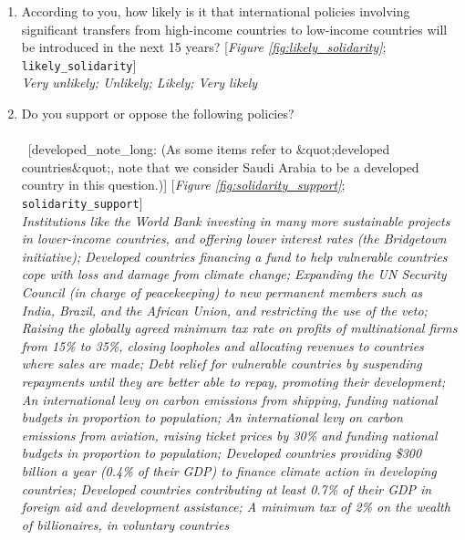 \begin{enumerate}[resume]
\item  \label{q:likely_solidarity} According to you, how likely is it that international policies involving significant transfers from high-income countries to low-income countries will be introduced in the next 15 years? [\textit{Figure \ref{fig:likely_solidarity}}; 
\verb|likely_solidarity|]
  \\ \textit{Very unlikely; Unlikely; Likely; Very likely}

\item  \label{q:solidarity_support} Do you support or oppose the following policies?\\
~\\ 
~[developed\_note\_long: (As some items refer to \&quot;developed countries\&quot;, note that we consider Saudi Arabia to be a developed country in this question.)] [\textit{Figure \ref{fig:solidarity_support}}; 
\verb|solidarity_support|]
  \\ \textit{Institutions like the World Bank investing in many more sustainable projects in lower-income countries, and offering lower interest rates (the Bridgetown initiative); Developed countries financing a fund to help vulnerable countries cope with loss and damage from climate change; Expanding the UN Security Council (in charge of peacekeeping) to new permanent members such as India, Brazil, and the African Union, and restricting the use of the veto; Raising the globally agreed minimum tax rate on profits of multinational firms from 15\% to 35\%, closing loopholes and allocating revenues to countries where sales are made; Debt relief for vulnerable countries by suspending repayments until they are better able to repay, promoting their development; An international levy on carbon emissions from shipping, funding national budgets in proportion to population; An international levy on carbon emissions from aviation, raising ticket prices by 30\% and funding national budgets in proportion to population; Developed countries providing \$300 billion a year (0.4\% of their GDP) to finance climate action in developing countries; Developed countries contributing at least 0.7\% of their GDP in foreign aid and development assistance; A minimum tax of 2\% on the wealth of billionaires, in voluntary countries}

\end{enumerate} 

